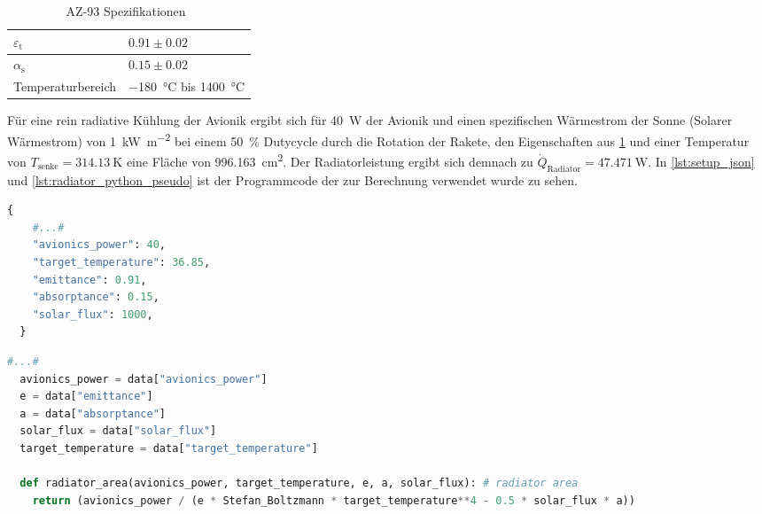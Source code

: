 \begin{table}[H]

  \centering
  \caption{AZ-93 Spezifikationen~\cite{AZ-Technology}}\label{tab:az-93_eigenschaften}

  \begin{tabular}{ll}

    \toprule[1pt]
    $\varepsilon_{\text{t}}$ & $0.91 \pm 0.02$ \\

    \midrule[0.5pt]
    $\alpha_{\text{s}}$ & $0.15 \pm 0.02$ \\

    \midrule[0.5pt]
    Temperaturbereich  & \SI{-180}{\degreeCelsius} bis \SI{1400}{\degreeCelsius} \\

    \bottomrule[1pt]
  \end{tabular}
\end{table}

Für eine rein radiative Kühlung der Avionik ergibt sich für \SI{40}{\watt} der Avionik und einen spezifischen Wärmestrom der Sonne (Solarer Wärmestrom) von \SI{1}{\kilo\watt\per\meter\squared}
bei einem \SI{50}{\percent} Dutycycle durch die Rotation der Rakete, den Eigenschaften aus \ref{tab:az-93_eigenschaften} und einer Temperatur von $T_\mathrm{senke} = \SI{314,13}{\kelvin}$
eine Fläche von \SI{996,163}{\centi\meter\squared}. Der Radiatorleistung ergibt sich demnach zu $\dot{Q}_\mathrm{Radiator} = \SI{47.471}{\watt}$.
In \ref{lst:setup_json} und \ref{lst:radiator_python_pseudo} ist der Programmcode der zur Berechnung
verwendet wurde zu sehen.

\begin{lstlisting}[float, language=python, caption={Setup Werte aus der setup.json}, label={lst:setup_json}]
  {
    #...#
    "avionics_power": 40,
    "target_temperature": 36.85,
    "emittance": 0.91,
    "absorptance": 0.15,
    "solar_flux": 1000,
  }
\end{lstlisting}

\begin{lstlisting}[float, language=Python, caption={Berechnung der Radiatorfläche in der radiator.py}, label={lst:radiator_python_pseudo}]
  #...#
  avionics_power = data["avionics_power"]
  e = data["emittance"]
  a = data["absorptance"]
  solar_flux = data["solar_flux"]
  target_temperature = data["target_temperature"]

  def radiator_area(avionics_power, target_temperature, e, a, solar_flux): # radiator area
    return (avionics_power / (e * Stefan_Boltzmann * target_temperature**4 - 0.5 * solar_flux * a))
\end{lstlisting}

